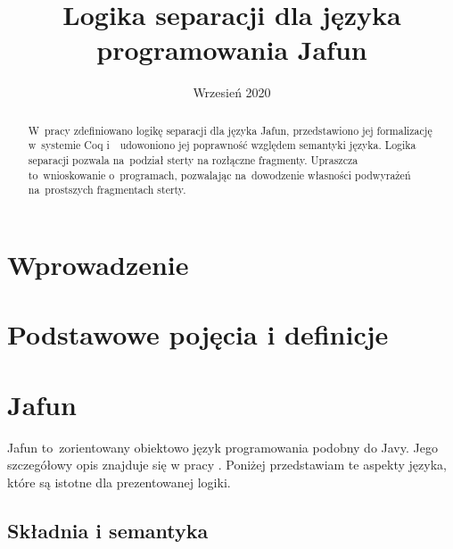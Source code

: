 \documentclass[]{pracamgr}
\title{Logika separacji dla języka programowania Jafun}
\date{Wrzesień 2020}
\renewcommand \| {\hspace{0.75em} | \hspace{0.75em} }
\renewcommand \[ {[\![}
\renewcommand \] {]\!]}
\theoremstyle{definition}
\begin{document}
\maketitle

\begin{abstract}
  W~pracy zdefiniowano logikę separacji dla języka Jafun, przedstawiono jej formalizację
  w~systemie Coq i~~udowoniono jej poprawność względem semantyki języka. Logika separacji pozwala
  na~podział sterty na rozłączne fragmenty. Upraszcza to~wnioskowanie o~programach, pozwalając
  na~dowodzenie własności podwyrażeń na~prostszych fragmentach sterty.
\end{abstract}

\tableofcontents

\chapter*{Wprowadzenie}

\chapter{Podstawowe pojęcia i definicje}

\chapter{Jafun}

Jafun to~zorientowany obiektowo język programowania podobny do Javy.
Jego szczegółowy opis znajduje się w pracy \cite{jafun-def}.
Poniżej przedstawiam te aspekty języka, które są istotne dla prezentowanej logiki.


\section{Składnia i semantyka}
\end{document}
